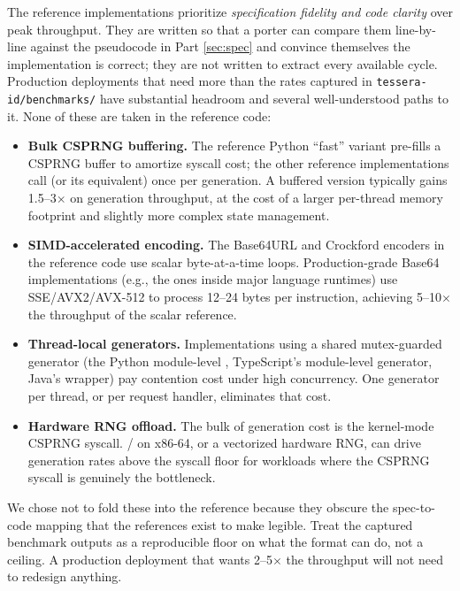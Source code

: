 \begin{calloutwarning}
The reference implementations prioritize \emph{specification fidelity and code clarity} over peak throughput. They are written so that a porter can compare them line-by-line against the pseudocode in Part \ref{sec:spec} and convince themselves the implementation is correct; they are not written to extract every available cycle. Production deployments that need more than the rates captured in \texttt{tessera-id/benchmarks/} have substantial headroom and several well-understood paths to it. None of these are taken in the reference code:
\begin{itemize}
  \item \textbf{Bulk CSPRNG buffering.} The reference Python ``fast'' variant pre-fills a CSPRNG buffer to amortize syscall cost; the other reference implementations call  (or its equivalent) once per generation. A buffered version typically gains 1.5--3$\times$ on generation throughput, at the cost of a larger per-thread memory footprint and slightly more complex state management.
  \item \textbf{SIMD-accelerated encoding.} The Base64URL and Crockford encoders in the reference code use scalar byte-at-a-time loops. Production-grade Base64 implementations (e.g., the ones inside major language runtimes) use SSE/AVX2/AVX-512 to process 12--24 bytes per instruction, achieving 5--10$\times$ the throughput of the scalar reference.
  \item \textbf{Thread-local generators.} Implementations using a shared mutex-guarded generator (the Python module-level , TypeScript's module-level generator, Java's  wrapper) pay contention cost under high concurrency. One generator per thread, or per request handler, eliminates that cost.
  \item \textbf{Hardware RNG offload.} The bulk of generation cost is the kernel-mode CSPRNG syscall. / on x86-64, or a vectorized hardware RNG, can drive generation rates above the syscall floor for workloads where the CSPRNG syscall is genuinely the bottleneck.
\end{itemize}
We chose not to fold these into the reference because they obscure the spec-to-code mapping that the references exist to make legible. Treat the captured benchmark outputs as a reproducible floor on what the format can do, not a ceiling. A production deployment that wants 2--5$\times$ the throughput will not need to redesign anything.
\end{calloutwarning}


